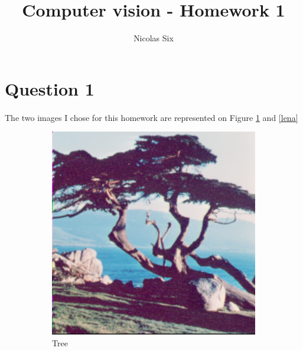 \documentclass[a4paper,11pt]{article}
\title{Computer vision - Homework 1}
\author{Nicolas Six}
\begin{document}
\maketitle

\section{Question 1}
\paragraph{}
The two images I chose for this homework are represented on Figure \ref{tree} and \ref{lena}

\begin{figure}[h!]
  \begin{center}
    \begin{subfigure}[t]{0.45\textwidth}
      \centering
      \includegraphics[width=0.9\linewidth]{Images/ps0-1-a-1.png}
      \caption{Tree}
      \label{tree}
    \end{subfigure}
    \begin{subfigure}[t]{0.45\textwidth}
      \centering

\end{subfigure}
\end{center}
\end{figure}
\end{document}
